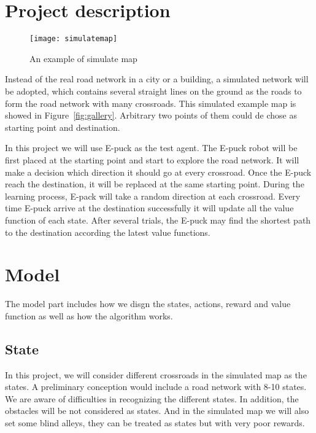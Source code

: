 \documentclass[
11pt, %
a4paper, %
oneside, %
headinclude%
BCOR3mm, %
]{scrartcl}
\begin{document}
\section{Project description}

\begin{figure}[tb]
\centering 
\texttt{[image: simulatemap]} 
\caption[An example of a floating figure]{An example of simulate map} %
\label{fig:gallery} 
\end{figure}

\quad 
Instead of the real road network in a city or a building, 
a simulated network will be adopted, which contains several straight lines on the ground as the roads to form the road network with many crossroads. 
This simulated example map is showed in Figure~\vref{fig:gallery}. %
Arbitrary two points of them could de chose as starting point and destination.

In this project we will use E-puck as the test agent. 
The E-puck robot will be first placed at the starting point and start to explore the road network. 
It will make a decision which direction it should go at every crossroad. Once the E-puck reach the destination, 
it will be replaced at the same starting point. 
During the learning process, E-pack will take a random direction at each crossroad. 
Every time E-puck arrive at the destination successfully it will update all the value function of each state. After several trials, 
the E-puck may find the shortest path to the destination according the latest value functions.




\section{Model}

\quad The model part includes how we disgn the states, actions, reward and value function as well as how the algorithm works.


\subsection{State}
\quad
In this project, we will consider different crossroads in the simulated map as the states. 
A preliminary conception would include a road network with 8-10 states. 
We are aware of difficulties in recognizing the different states.
In addition, the obstacles will be not considered as states. 
And in the simulated map we will also set some blind alleys, they can be treated as states but with very poor rewards.
\end{document}
